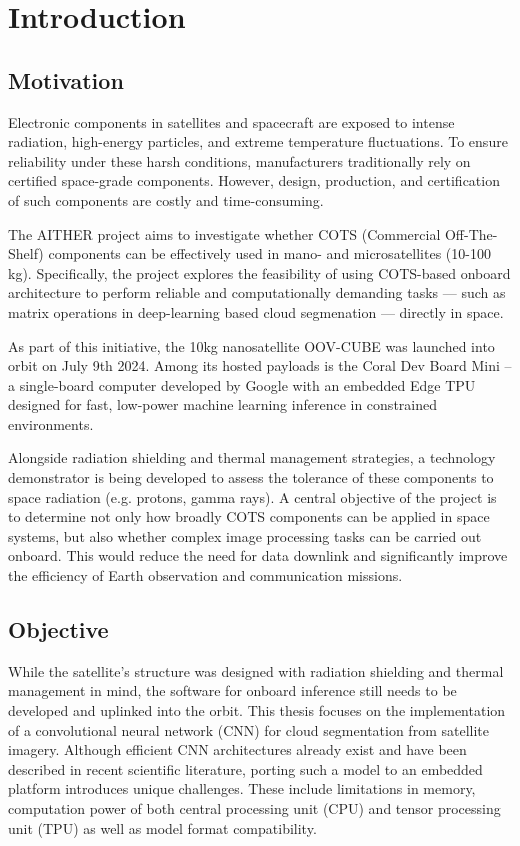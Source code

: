 {

\setlength{\parindent}{0pt}
\setlength{\parskip}{1em}

\section{Introduction}
\subsection{Motivation}

Electronic components in satellites and spacecraft are exposed to intense radiation, high-energy particles, and extreme temperature fluctuations. To ensure reliability under these harsh conditions, manufacturers traditionally rely on certified space-grade components. However, design, production, and certification of such components are costly and time\--con\-su\-ming. 

The AITHER project aims to investigate whether COTS (Commercial Off-The-Shelf) components can be effectively used in mano- and microsatellites (10-100 kg). Specifically, the project explores the feasibility of using COTS-based onboard architecture to perform reliable and computationally demanding tasks --- such as matrix operations in deep-learning based cloud segmenation --- directly in space. 

As part of this initiative, the 10kg nanosatellite OOV-CUBE was launched into orbit on July 9th 2024. Among its hosted payloads is the Coral Dev Board Mini – a single-board computer developed by Google with an embedded Edge TPU designed for fast, low-power machine learning inference in constrained environments.

Alongside radiation shielding and thermal management strategies, a technology demonstrator is being developed to assess the tolerance of these components to space radiation (e.g. protons, gamma rays). A central objective of the project is to determine not only how broadly COTS components can be applied in space systems, but also whether complex image processing tasks can be carried out onboard. This would reduce the need for data downlink and significantly improve the efficiency of Earth observation and communication missions.

\subsection{Objective}

While the satellite's structure was designed with radiation shielding and thermal management in mind, the software for onboard inference still needs to be developed and uplinked into the orbit. This thesis focuses on the implementation of a convolutional neural network (CNN) for cloud segmentation from satellite imagery. Although efficient CNN architectures already exist and have been described in recent scientific literature, porting such a model to an embedded platform introduces unique challenges. These include limitations in memory, computation power of both central processing unit (CPU) and tensor processing unit (TPU) as well as model format compatibility.

}
